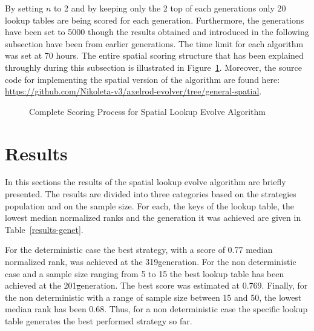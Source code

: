 By setting \(n\) to 2 and by keeping only the 2 top of each generations only
20 lookup tables are being scored for each generation. Furthermore, the generations
have been set to 5000 though the results obtained and introduced in the following
subsection have been from earlier generations. The time limit for each algorithm
was set at 70 hours. The entire spatial scoring structure that
has been explained throughly during this subsection is illustrated in Figure~\ref{fig:spatial-evolve}.
Moreover, the source code for implementing the spatial version of the algorithm
are found here: \url{https://github.com/Nikoleta-v3/axelrod-evolver/tree/general-spatial}.

\begin{figure}[H]
		
		\caption{Complete Scoring Process for Spatial Lookup Evolve Algorithm}
  \label{fig:spatial-evolve}
\end{figure}

\section{Results}
\label{sub:results}
In this sections the results of the spatial lookup evolve algorithm are briefly
presented. The results are divided into three categories based on the strategies
population and on the sample size. For each, the keys of the lookup table,
the lowest median normalized ranks and the generation it was achieved are given
in Table~\ref{results-genet}.

For the deterministic case the best strategy, with a score of 0.77 median normalized
rank, was achieved at the 319\nth generation. For the non deterministic case
and a sample size ranging from 5 to 15 the best lookup table has been achieved at
the 201\st generation. The best score was estimated at 0.769. Finally, for the
non deterministic with a range of sample size between 15 and 50, the lowest median rank has been 0.68.
Thus, for a non deterministic case the specific lookup table generates the best performed strategy so far.

